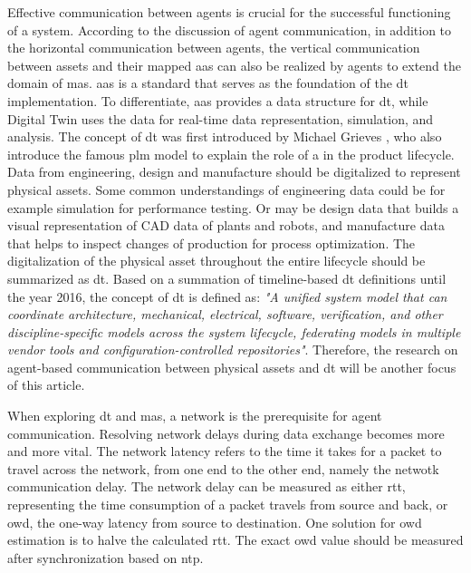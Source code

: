 Effective communication between agents is crucial for the successful functioning of a 
system\cite{georgeff_communication_1988}. According to the discussion of agent 
communication\cite{vogel-heuser_multi-agent_2020}, in addition to the horizontal 
communication between agents, the vertical communication between assets 
and their mapped \gls{aas} can also be realized by agents to extend the domain 
of \gls{mas}. \gls{aas} is a standard 
that serves as the foundation of the \gls{dt} implementation\cite{redeker_towards_2021}. 
To differentiate, \gls{aas} provides a data structure for \gls{dt}, while Digital 
Twin uses the data for real-time data representation, simulation, and analysis. 
The concept of \gls{dt} was first introduced by Michael 
Grieves \cite{flumerfelt_complex_2019}, who also introduce the 
famous \gls{plm} model \cite{greengard_digital_nodate}to 
explain the role of a in the product lifecycle. Data from engineering, 
design and manufacture should be digitalized to represent physical 
assets. Some common understandings of engineering data could be 
for example simulation for performance testing. Or may be design data 
that builds a visual representation of CAD data of plants and robots, 
and manufacture data that helps to inspect changes of production for 
process optimization. The digitalization of the physical asset 
throughout the entire lifecycle should be summarized as \gls{dt}.
Based on a summation of timeline-based \gls{dt} definitions until the year 
2016\cite{negri_review_2017}, the concept of \gls{dt} is defined as: \textit{"A 
unified system model that can coordinate architecture, mechanical, electrical, 
software, verification, and other discipline-specific models across the system 
lifecycle, federating models in multiple vendor tools and configuration-controlled 
repositories"}\cite{bajaj_architecture_2016}. Therefore, the research on agent-based 
communication between physical assets and \gls{dt} will be another focus of this 
article. 


When exploring \gls{dt} and \gls{mas}, a network is the prerequisite for agent communication. 
Resolving network delays during data exchange becomes more and more vital. The network 
latency refers to the time it takes for a packet to travel across the network, from one end 
to the other end, namely the netwotk communication delay. The network delay can be measured 
as either \gls{rtt}, representing the time consumption of a packet travels from source and 
back, or \gls{owd}, the one-way latency from source to 
destination. One solution for \gls{owd} estimation\cite{abdou_accurate_2015} is 
to halve the calculated \gls{rtt}\cite{karn_improving_nodate}. 
The exact \gls{owd} value should be measured after synchronization based on \gls{ntp}\cite{abdou_accurate_2015}. 


